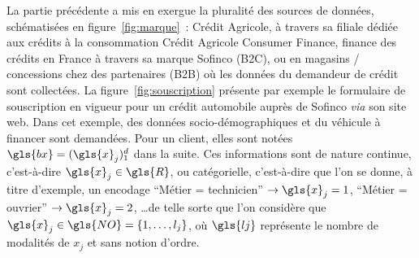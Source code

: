 La partie précédente a mis en exergue la pluralité des sources de données, schématisées en figure~\ref{fig:marque}~: Crédit Agricole, à travers sa filiale dédiée aux crédits à la consommation Crédit Agricole Consumer Finance, finance des crédits en France à travers sa marque Sofinco (B2C), ou en magasins / concessions chez des partenaires (B2B) où les données du demandeur de crédit sont collectées. La figure~\ref{fig:souscription} présente par exemple le formulaire de souscription en vigueur pour un crédit automobile auprès de Sofinco \textit{via} son site web. Dans cet exemple, des données socio-démographiques et du véhicule à financer sont demandées. Pour un client, elles sont notées $\gls{bx} = (\gls{x}_j)_1^d$ dans la suite. Ces informations sont de nature continue, c'est-à-dire $\gls{x}_j \in \gls{R}$, ou catégorielle, c'est-à-dire que l'on se donne, à titre d'exemple, un encodage ``Métier = technicien'' $\rightarrow \gls{x}_j = 1$, ``Métier = ouvrier'' $\rightarrow \gls{x}_j = 2$, \dots de telle sorte que l'on considère que $\gls{x}_j \in \gls{NO} = \{1, \dots,l_j\}$, où $\gls{lj}$ représente le nombre de modalités de $x_j$ et sans notion d'ordre. 

